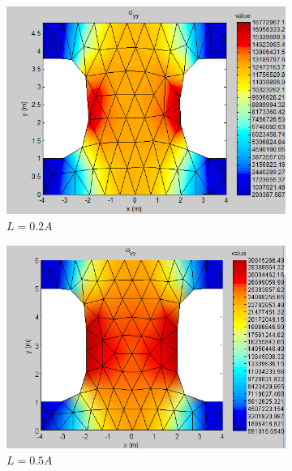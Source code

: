 \documentclass[paper=letter, fontsize=11pt]{scrartcl} %
\numberwithin{equation}{section} %
\numberwithin{figure}{section} %
\numberwithin{table}{section} %
\begin{document}
\begin{figure}[h]
	\begin{subfigure}[b]{0.45\textwidth}
		\includegraphics[width=\textwidth]{stress02.png}
		\caption{$L = 0.2 A$}
	\end{subfigure}
	\hfill
	\begin{subfigure}[b]{0.45\textwidth}
		\includegraphics[width=\textwidth]{stress05.png}
		\caption{$L = 0.5 A$}
	\end{subfigure}
	\\
	\begin{subfigure}[b]{0.45\textwidth}

\end{subfigure}
\end{figure}
\end{document}
